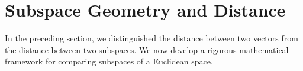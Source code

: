\documentclass[14pt,letterpaper]{article}
\theoremstyle{plain}
\theoremstyle{definition}
\theoremstyle{remark}
\newcommand{\R}{\mathbb{R}}
\begin{document}

\section{Subspace Geometry and Distance}
\label{sec:subspace_geometry}

In the preceding section, we distinguished the
distance between two vectors from the distance
between two subspaces. We now develop a rigorous
mathematical framework for comparing subspaces
of a Euclidean space.
\end{document}
